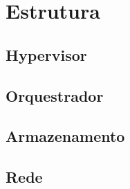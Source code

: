 \chapter{Estrutura}

\section{Hypervisor}
\section{Orquestrador}
\section{Armazenamento}
\section{Rede}
